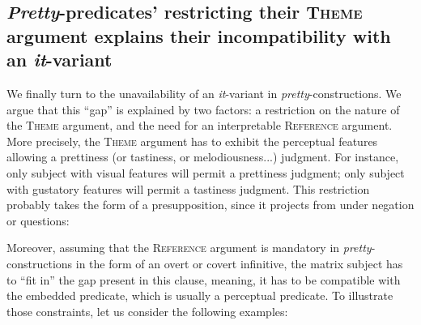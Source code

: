 \documentclass[11pt]{article}
\begin{document}
\subsection{\textit{Pretty}-predicates' restricting their \textsc{Theme} argument explains their incompatibility with an \textit{it}-variant}
We finally turn to the unavailability of an \textit{it}-variant in \textit{pretty}-constructions. We argue that this ``gap'' is explained by two factors: a restriction on the nature of the \textsc{Theme} argument, and the need for an interpretable \textsc{Reference} argument. More precisely, the \textsc{Theme} argument has to exhibit the perceptual features allowing a prettiness (or tastiness, or melodiousness...) judgment. For instance, only subject with visual features will permit a prettiness judgment; only subject with gustatory features will permit a tastiness judgment. This restriction probably takes the form of a presupposition, since it projects from under negation or questions:
\begin{exe}
	\ex 
	\begin{xlist}
	\end{xlist}
\end{exe} 
Moreover, assuming that the \textsc{Reference} argument is mandatory in \textit{pretty}-constructions in the form of an overt or covert infinitive, the matrix subject has to ``fit in'' the gap present in this clause, meaning, it has to be compatible with the embedded predicate, which is usually a perceptual predicate. To illustrate those constraints, let us consider the following examples:
\begin{exe}
	\ex 
	\begin{xlist}
		\label{ex:pretty-tangible-dp-interpretable}
		\label{ex:pretty-abstract-dp-interpretable}
		\label{ex:pretty-tangible-dp-uninterpretable}
		\label{ex:pretty-tangible-gerund-dp-interpretable}
	\end{xlist}
\end{exe}
\end{document}
